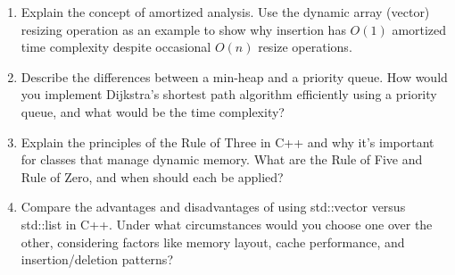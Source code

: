 \documentclass[11pt]{article}
\begin{document}
\begin{enumerate}[label=\textbf{\arabic*.}]
  \item Explain the concept of amortized analysis. Use the dynamic array (vector) resizing operation 
  as an example to show why insertion has $O(1)$ amortized time complexity despite occasional $O(n)$ 
  resize operations.

  \item Describe the differences between a min-heap and a priority queue. How would you implement 
  Dijkstra's shortest path algorithm efficiently using a priority queue, and what would be the 
  time complexity?

  \item Explain the principles of the Rule of Three in C++ and why it's important for classes that 
  manage dynamic memory. What are the Rule of Five and Rule of Zero, and when should each be applied?

  \item Compare the advantages and disadvantages of using std::vector versus std::list in C++. 
  Under what circumstances would you choose one over the other, considering factors like memory 
  layout, cache performance, and insertion/deletion patterns?

\end{enumerate}
\end{document}
